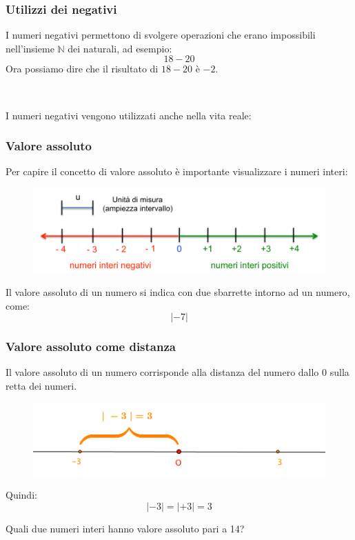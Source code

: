 \documentclass[handout]{beamer}
\theoremstyle{plain}
\begin{document}
\begin{frame}
\frametitle{Utilizzi dei negativi}
I numeri negativi permettono di svolgere operazioni che erano impossibili nell'insieme $ \mathbb{N} $ dei naturali, ad esempio:
\[18- 20 \]\pause
Ora possiamo dire che il risultato di $ 18-20 $ è $ -2 $.\pause

~

I numeri negativi vengono utilizzati anche nella vita reale:
\end{frame}


\begin{frame}
\frametitle{Valore assoluto}
Per capire il concetto di valore assoluto è importante \alert{visualizzare} i numeri interi:
\begin{figure}
  \includegraphics[width=.8\columnwidth]{img/rettarelativi.png}
\end{figure}\pause
Il valore assoluto di un numero si indica con \alert{due sbarrette intorno ad un numero}, come:
\[|-7|\]
\end{frame}

\begin{frame}
\frametitle{Valore assoluto come distanza}
Il valore assoluto di un numero corrisponde alla \alert{distanza del numero dallo 0} sulla retta dei numeri.
\begin{figure}
  \includegraphics[width=.8\columnwidth]{img/modulodistanza.png}
\end{figure}
Quindi:
\[|-3| = |+3| = 3\]\pause

Quali due numeri interi hanno valore assoluto pari a 14?
\end{frame}
\end{document}
